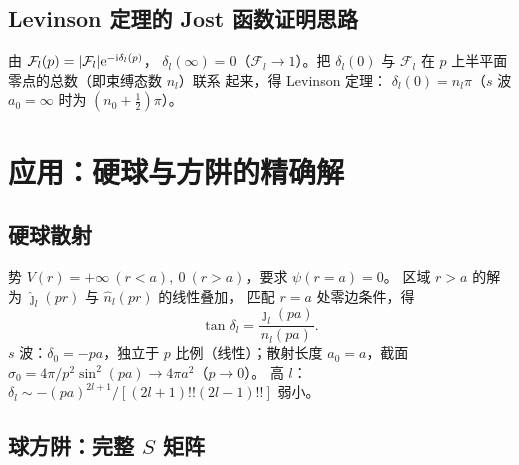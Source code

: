 \subsection{Levinson 定理的 Jost 函数证明思路}

由 $\mathcal F_l(p)=|\mathcal F_l|\mathrm{e}^{-\mathrm{i}\delta_l(p)}$，
$\delta_l(\infty)=0$（$\mathcal F_l\to1$）。把 $\delta_l(0)$ 与
$\mathcal F_l$ 在 $p$ 上半平面零点的总数（即束缚态数 $n_l$）联系
起来，得 Levinson 定理：
$\delta_l(0)=n_l\pi$（$s$ 波 $a_0=\infty$ 时为 $(n_0+\tfrac12)\pi$）。

\section{应用：硬球与方阱的精确解}\label{sec:examples}

\subsection{硬球散射}

势 $V(r)=+\infty\ (r<a),\ 0\ (r>a)$，要求 $\psi(r=a)=0$。
区域 $r>a$ 的解为 $\hat\jmath_l(pr)$ 与 $\hat n_l(pr)$ 的线性叠加，
匹配 $r=a$ 处零边条件，得
\begin{equation}\label{eq:hardsphere}
\tan\delta_l = \frac{\hat\jmath_l(pa)}{\hat n_l(pa)}.
\end{equation}
$s$ 波：$\delta_0=-pa$，独立于 $p$ 比例（线性）；散射长度
$a_0=a$，截面 $\sigma_0=4\pi/p^2\sin^2(pa)\to 4\pi a^2$（$p\to0$）。
高 $l$：$\delta_l\sim -(pa)^{2l+1}/[(2l+1)!!(2l-1)!!]$ 弱小。

\subsection{球方阱：完整 $S$ 矩阵}

